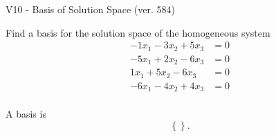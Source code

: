 \begin{exercise}
  \begin{exerciseTitle}V10 - Basis of Solution Space (ver. 584)\end{exerciseTitle}
  \begin{exerciseStatement}
    Find a basis for the solution space of the homogeneous system 
\begin{align*}
 -1 x_ 1 -3 x_ 2 + 5 x_ 3 &= 0  \\ 
  -5 x_ 1 + 2 x_ 2 -6 x_ 3 &= 0  \\ 
  1 x_ 1 + 5 x_ 2 -6 x_ 3 &= 0  \\ 
  -6 x_ 1 -4 x_ 2 + 4 x_ 3 &= 0  \\ 
 \end{align*}


 
  \end{exerciseStatement}

  \begin{exerciseAnswer}
   A basis is   
\[\left\{\right\}.\]

  


  \end{exerciseAnswer}
\end{exercise}